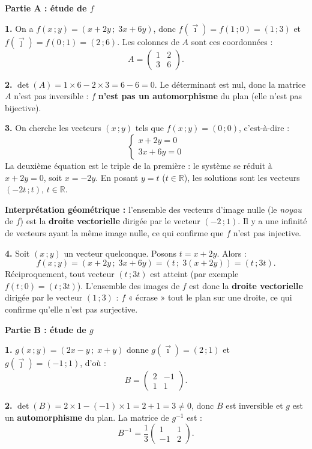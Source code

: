 \documentclass[11pt]{article}
\begin{document}
\begin{corrige}
\textbf{Partie A : étude de $f$}

\textbf{1.} On a $f(x\,; y) = (x + 2y\,; \; 3x + 6y)$, donc $f(\vec{\imath}) = f(1\,;0) = (1\,; 3)$ et $f(\vec{\jmath}) = f(0\,;1) = (2\,; 6)$. Les colonnes de $A$ sont ces coordonnées :
\[ A = \begin{pmatrix} 1 & 2 \\ 3 & 6 \end{pmatrix}. \]

\textbf{2.} $\det(A) = 1\times 6 - 2\times 3 = 6 - 6 = 0$. Le déterminant est nul, donc la matrice $A$ n'est pas inversible : $f$ \textbf{n'est pas un automorphisme} du plan (elle n'est pas bijective).

\textbf{3.} On cherche les vecteurs $(x\,; y)$ tels que $f(x\,; y) = (0\,; 0)$, c'est-à-dire :
\[ \begin{cases} x + 2y = 0 \\ 3x + 6y = 0 \end{cases} \]
La deuxième équation est le triple de la première : le système se réduit à $x + 2y = 0$, soit $x = -2y$. En posant $y = t$ ($t \in \mathbb{R}$), les solutions sont les vecteurs $(-2t\,; t)$, $t \in \mathbb{R}$.

\textbf{Interprétation géométrique :} l'ensemble des vecteurs d'image nulle (le \emph{noyau} de $f$) est la \textbf{droite vectorielle} dirigée par le vecteur $(-2\,; 1)$. Il y a une infinité de vecteurs ayant la même image nulle, ce qui confirme que $f$ n'est pas injective.

\textbf{4.} Soit $(x\,; y)$ un vecteur quelconque. Posons $t = x + 2y$. Alors :
\[ f(x\,; y) = (x + 2y\,; \; 3x + 6y) = (t\,; \; 3(x + 2y)) = (t\,; 3t). \]
Réciproquement, tout vecteur $(t\,; 3t)$ est atteint (par exemple $f(t\,; 0) = (t\,; 3t)$). L'ensemble des images de $f$ est donc la \textbf{droite vectorielle} dirigée par le vecteur $(1\,; 3)$ : $f$ « écrase » tout le plan sur une droite, ce qui confirme qu'elle n'est pas surjective.

\textbf{Partie B : étude de $g$}

\textbf{1.} $g(x\,; y) = (2x - y\,; \; x + y)$ donne $g(\vec{\imath}) = (2\,; 1)$ et $g(\vec{\jmath}) = (-1\,; 1)$, d'où :
\[ B = \begin{pmatrix} 2 & -1 \\ 1 & 1 \end{pmatrix}. \]

\textbf{2.} $\det(B) = 2\times 1 - (-1)\times 1 = 2 + 1 = 3 \neq 0$, donc $B$ est inversible et $g$ est un \textbf{automorphisme} du plan. La matrice de $g^{-1}$ est :
\[ B^{-1} = \frac{1}{3}\begin{pmatrix} 1 & 1 \\ -1 & 2 \end{pmatrix}. \]


\end{corrige}
\end{document}
